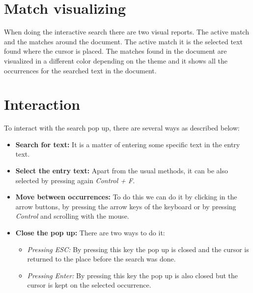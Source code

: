 
\newpage
\section{Match visualizing}

When doing the interactive search there are two visual reports. The active match and the matches around the document. The active match it is the selected text found where the cursor is placed. The matches found in the document are visualized in a different color depending on the theme and it shows all the occurrences for the searched text in the document.


\section{Interaction}

To interact with the search pop up, there are several ways as described below:
\begin{itemize}
  \item \textbf{Search for text:} It is a matter of entering some specific text in the entry text.
  \item \textbf{Select the entry text:} Apart from the usual methods, it can be also selected by pressing again \emph{Control + F}.
  \item \textbf{Move between occurrences:} To do this we can do it by clicking in the arrow buttons, by pressing the arrow keys of the keyboard or by pressing \emph{Control} and scrolling with the mouse.
  \item \textbf{Close the pop up:} There are two ways to do it:
    \begin{itemize}
      \item \textit{Pressing ESC:} By pressing this key the pop up is closed and the cursor is returned to the place before the search was done.
      \item \textit{Pressing Enter:} By pressing this key the pop up is also closed but the cursor is kept on the selected occurrence.
    \end{itemize}
\end{itemize}
